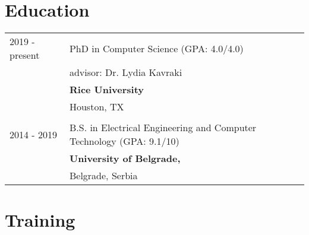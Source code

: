 \documentclass[a4paper,12pt]{article}
\begin{document}



\section{Education}
\begin{tabularx}{\linewidth}{@{}l X@{}}	

2019 - present & PhD in Computer Science \hfill (GPA: 4.0/4.0) \\ 
& advisor: Dr. Lydia Kavraki \\
& \textbf{Rice University} \\
& Houston, TX \\
\\
2014 - 2019 & B.S. in Electrical Engineering and Computer Technology \hfill  (GPA: 9.1/10) \\
& \textbf{University of Belgrade,} \\
& Belgrade, Serbia \\
\end{tabularx}



\section{Training}
\end{document}
